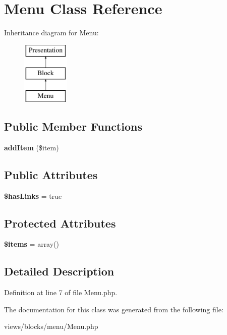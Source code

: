 \hypertarget{class_menu}{
\section{Menu Class Reference}
\label{class_menu}
}
Inheritance diagram for Menu:\begin{figure}[H]
\begin{center}
\leavevmode
\includegraphics[height=3.000000cm]{class_menu}
\end{center}
\end{figure}
\subsection*{Public Member Functions}
\begin{DoxyCompactItemize}
\item 
\hypertarget{class_menu_a14ad9c9d38b6f8a899dcf7781e733cbb}{
{\bfseries addItem} (\$item)}
\label{class_menu_a14ad9c9d38b6f8a899dcf7781e733cbb}

\end{DoxyCompactItemize}
\subsection*{Public Attributes}
\begin{DoxyCompactItemize}
\item 
\hypertarget{class_menu_a3c5240220e7dea76c0ee6ef7ebeb7d3f}{
{\bfseries \$hasLinks} = true}
\label{class_menu_a3c5240220e7dea76c0ee6ef7ebeb7d3f}

\end{DoxyCompactItemize}
\subsection*{Protected Attributes}
\begin{DoxyCompactItemize}
\item 
\hypertarget{class_menu_aceaeba8171a86d5c04ce42233077c57c}{
{\bfseries \$items} = array()}
\label{class_menu_aceaeba8171a86d5c04ce42233077c57c}

\end{DoxyCompactItemize}


\subsection{Detailed Description}


Definition at line 7 of file Menu.php.



The documentation for this class was generated from the following file:\begin{DoxyCompactItemize}
\item 
views/blocks/menu/Menu.php\end{DoxyCompactItemize}
